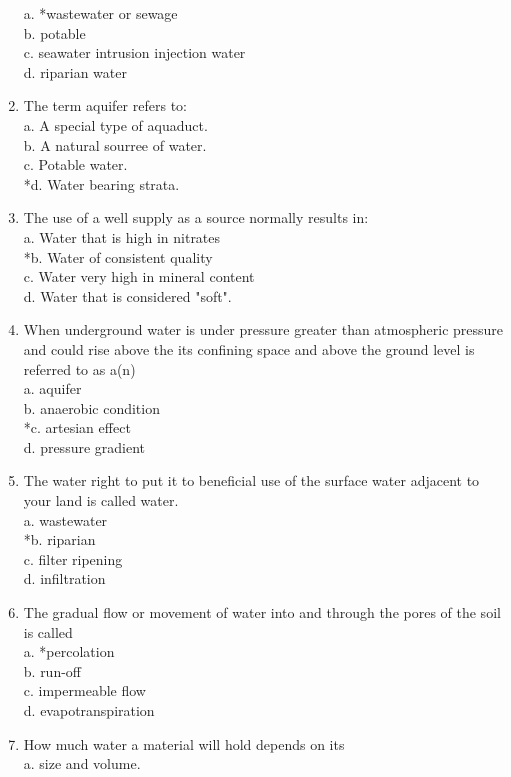 \begin{enumerate}
a. *wastewater or sewage\\
b. potable\\
c. seawater intrusion injection water\\
d. riparian water\\
\item The term aquifer refers to:\\
a. A special type of aquaduct.\\
b. A natural sourree of water.\\
c. Potable water.\\
*d.  Water bearing strata.\\
\item The use of a well supply as a source normally results in:\\
a. Water that is high in nitrates\\
*b. Water of consistent quality\\
c. Water very high in mineral content\\
d. Water that is considered "soft".\\
\item When underground water is under pressure greater than atmospheric pressure and could rise above the its confining space and above the ground level is referred to as a(n)\\
a. aquifer\\
b. anaerobic condition\\
*c. artesian effect\\
d. pressure gradient\\
\item The water right to put it to beneficial use of the surface water adjacent to your land is called water.\\
a. wastewater\\
*b. riparian\\
c. filter ripening\\
d. infiltration\\
\item The gradual flow or movement of water into and through the pores of the soil is called\\
a. *percolation\\
b. run-off\\
c. impermeable flow\\
d. evapotranspiration\\
\item How much water a material will hold depends on its\\
a. size and volume.\\

\end{enumerate}
